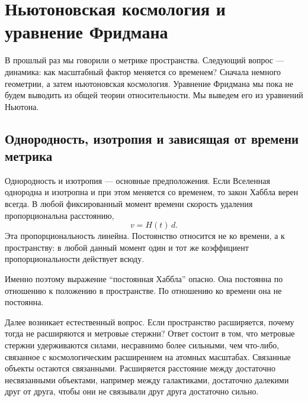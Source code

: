 \chapter{Ньютоновская космология и уравнение Фридмана}

В прошлый раз мы говорили о метрике пространства. Следующий вопрос — динамика: как масштабный фактор меняется со временем? Сначала немного геометрии, а затем ньютоновская космология. Уравнение Фридмана мы пока не будем выводить из общей теории относительности. Мы выведем его из уравнений Ньютона.

\section{Однородность, изотропия и зависящая от времени метрика}

Однородность и изотропия — основные предположения. Если Вселенная однородна и изотропна и при этом меняется со временем, то закон Хаббла верен всегда. В любой фиксированный момент времени скорость удаления пропорциональна расстоянию,
\begin{equation}
v = H(t)\,d.
\end{equation}
Эта пропорциональность линейна. Постоянство относится не ко времени, а к пространству: в любой данный момент один и тот же коэффициент пропорциональности действует всюду.

\begin{classroomqa}
\end{classroomqa}

Именно поэтому выражение ``постоянная Хаббла'' опасно. Она постоянна по отношению к положению в пространстве. По отношению ко времени она не постоянна.

Далее возникает естественный вопрос. Если пространство расширяется, почему тогда не расширяются и метровые стержни? Ответ состоит в том, что метровые стержни удерживаются силами, несравнимо более сильными, чем что-либо, связанное с космологическим расширением на атомных масштабах. Связанные объекты остаются связанными. Расширяется расстояние между достаточно несвязанными объектами, например между галактиками, достаточно далекими друг от друга, чтобы они не связывали друг друга достаточно сильно.

